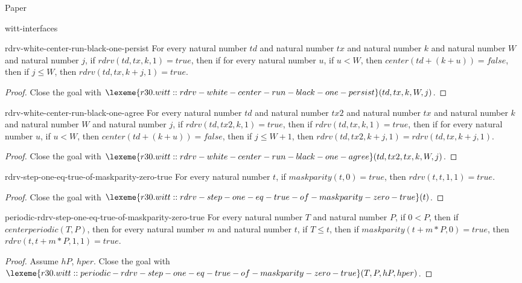 \begin{lexlean}{Paper}
\begin{section}{witt-interfaces}
  \begin{theorem}{rdrv-white-center-run-black-one-persist}
  For every natural number \(td\) and natural number \(tx\) and natural number \(k\) and natural number \(W\) and natural number \(j\), if \(rdrv(td, tx, k, 1) = true\), then if for every natural number \(u\), if \(u < W\), then \(center(td + (k + u)) = false\), then if \(j ≤ W\), then \(rdrv(td, tx, k + j, 1) = true\).
  \begin{proof}
  Close the goal with \(\lexeme{r30.witt::rdrv-white-center-run-black-one-persist}(td, tx, k, W, j)\).
  \end{proof}
  \end{theorem}

  \begin{theorem}{rdrv-white-center-run-black-one-agree}
  For every natural number \(td\) and natural number \(tx2\) and natural number \(tx\) and natural number \(k\) and natural number \(W\) and natural number \(j\), if \(rdrv(td, tx2, k, 1) = true\), then if \(rdrv(td, tx, k, 1) = true\), then if for every natural number \(u\), if \(u < W\), then \(center(td + (k + u)) = false\), then if \(j ≤ W + 1\), then \(rdrv(td, tx2, k + j, 1) = rdrv(td, tx, k + j, 1)\).
  \begin{proof}
  Close the goal with \(\lexeme{r30.witt::rdrv-white-center-run-black-one-agree}(td, tx2, tx, k, W, j)\).
  \end{proof}
  \end{theorem}

  \begin{theorem}{rdrv-step-one-eq-true-of-maskparity-zero-true}
  For every natural number \(t\), if \(maskparity(t, 0) = true\), then \(rdrv(t, t, 1, 1) = true\).
  \begin{proof}
  Close the goal with \(\lexeme{r30.witt::rdrv-step-one-eq-true-of-maskparity-zero-true}(t)\).
  \end{proof}
  \end{theorem}

  \begin{theorem}{periodic-rdrv-step-one-eq-true-of-maskparity-zero-true}
  For every natural number \(T\) and natural number \(P\), if \(0 < P\), then if \(centerperiodic(T, P)\), then for every natural number \(m\) and natural number \(t\), if \(T ≤ t\), then if \(maskparity(t + m * P, 0) = true\), then \(rdrv(t, t + m * P, 1, 1) = true\).
  \begin{proof}
  Assume \(hP\), \(hper\).
  Close the goal with \(\lexeme{r30.witt::periodic-rdrv-step-one-eq-true-of-maskparity-zero-true}(T, P, hP, hper)\).
  \end{proof}
  \end{theorem}


\end{section}
\end{lexlean}

